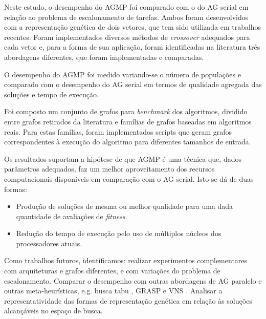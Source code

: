 \documentclass[fleqn,10pt]{SelfArx} %
\begin{document}
Neste estudo, o desempenho do AGMP foi comparado com o do AG serial em relação ao problema de escalonamento de tarefas. Ambos foram desenvolvidos com a representação genética de dois vetores, que tem sido utilizada em trabalhos recentes. Foram implementados diversos métodos de \textit{crossover} adequados para cada vetor e, para a forma de sua aplicação, foram identificadas na literatura três abordagens diferentes, que foram implementadas e comparadas.

O desempenho do AGMP foi medido variando-se o número de populações e comparado com o desempenho do AG serial em termos de qualidade agregada das soluções e tempo de execução.

Foi composto um conjunto de grafos para \textit{benchmark} dos algoritmos, dividido entre grafos retirados da literatura e famílias de grafos baseadas em algoritmos reais. Para estas famílias, foram implementados scripts que geram grafos correspondentes à execução do algoritmo para diferentes tamanhos de entrada.

Os resultados suportam a hipótese de que AGMP é uma técnica que, dados parâmetros adequados, faz um melhor aproveitamento dos recursos computacionais disponíveis em comparação com o AG serial. Isto se dá de duas formas:

\begin{itemize}
\item Produção de soluções de mesma ou melhor qualidade para uma dada quantidade de avaliações de \textit{fitness}.
\item Redução do tempo de execução pelo uso de múltiplos núcleos dos processadores atuais.
\end{itemize}

Como trabalhos futuros, identificamos: realizar experimentos complementares com arquiteturas e grafos diferentes, e com variações do problema de escalonamento. Comparar o desempenho com outras abordagens de AG paralelo e outras meta-heurísticas, e.g. busca tabu \cite{Glover1999}, GRASP \cite{Feo1995} e VNS \cite{MLADENOVIC19971097}. Analisar a representatividade das formas de representação genética em relação às soluções alcançáveis no espaço de busca.
\end{document}
